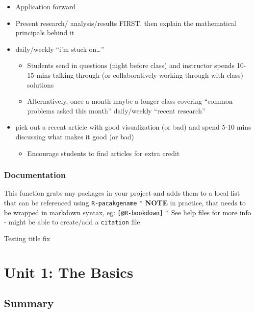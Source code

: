 \documentclass[
]{book}
\providecommand{\tightlist}{%
  \setlength{\itemsep}{0pt}\setlength{\parskip}{0pt}}
\begin{document}
\begin{itemize}
\tightlist
\item
  Application forward
\item
  Present research/ analysis/results FIRST, then explain the mathematical principals behind it
\item
  daily/weekly ``i'm stuck on\ldots{}''

  \begin{itemize}
  \tightlist
  \item
    Students send in questions (night before class) and instructor spends 10-15 mins talking through (or collaboratively working through with class) solutions
  \item
    Alternatively, once a month maybe a longer class covering ``common problems asked this month''
    daily/weekly ``recent research''
  \end{itemize}
\item
  pick out a recent article with good visualization (or bad) and spend 5-10 mins discussing what makes it good (or bad)

  \begin{itemize}
  \tightlist
  \item
    Encourage students to find articles for extra credit
  \end{itemize}
\end{itemize}

\hypertarget{documentation}{%
\subsection*{Documentation}\label{documentation}}

This function grabs any packages in your project and adds them to a local list that can be referenced using \texttt{R-pacakgename}
* \textbf{NOTE} in practice, that needs to be wrapped in markdown syntax, eg:
\texttt{{[}@R-bookdown{]}}
* See help files for more info - might be able to create/add a \texttt{citation} file

Testing title fix

\hypertarget{unit-1-the-basics}{%
\chapter*{Unit 1: The Basics}\label{unit-1-the-basics}}

\hypertarget{summary}{%
\section*{Summary}\label{summary}}
\end{document}
